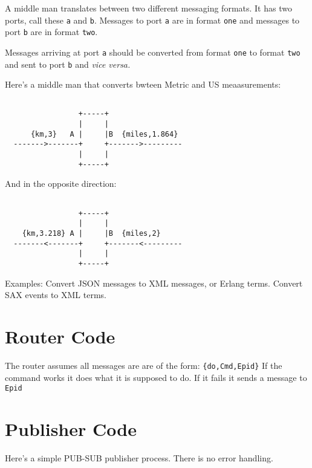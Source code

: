 \documentclass[10pt]{article}
\begin{document}
A middle man translates between two different messaging formats.  It has
two ports, call these \verb+a+ and \verb+b+.  Messages to port
\verb+a+ are in format \verb+one+ and messages to port \verb+b+ are in
format \verb+two+.

Messages arriving at port \verb+a+ should be converted from format
\verb+one+ to format \verb+two+ and sent to port \verb+b+ and {\sl
  vice versa.}

Here's a middle man that converts bwteen Metric and US meaasurements:

\begin{verbatim}

                 +-----+
                 |     |
      {km,3}   A |     |B  {miles,1.864}
  ------->-------+     +------->---------    
                 |     |
                 +-----+
\end{verbatim}

And in the opposite direction:

\begin{verbatim}

                 +-----+
                 |     |
    {km,3.218} A |     |B  {miles,2}
  -------<-------+     +-------<---------    
                 |     |
                 +-----+
\end{verbatim}


Examples: Convert JSON messages to XML messages, or Erlang terms.
Convert SAX events to XML terms.
 
\section{Router Code}


The router assumes all messages are
are of the form: \verb+{do,Cmd,Epid}+
If the command works it does what it is supposed to do. If it fails
it sends a message to \verb+Epid+

\section{Publisher Code}

Here's a simple PUB-SUB publisher process. There is no error
handling.

\end{document}
